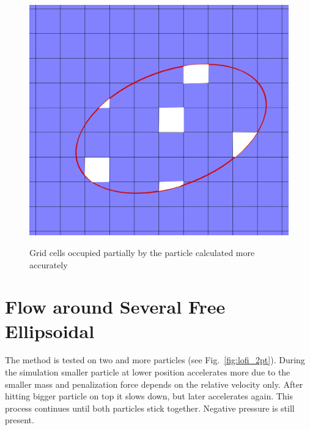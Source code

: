 \begin{figure}[h!]
\centering \includegraphics[scale=0.2]{fig/lofi_vf.png}\\
\caption{Grid cells occupied partially by the particle calculated more accurately \label{fig:lofi-vf}}
\end{figure}

\section{Flow around Several Free Ellipsoidal}
The method is tested on two and more particles (see Fig.~\ref{fig:lofi_2pt}). During the simulation smaller particle at lower position accelerates more due to the smaller mass and penalization force depends on the relative velocity only. After hitting bigger particle on top it slows down, but later accelerates again. This process continues until both particles stick together. Negative pressure is still present.

